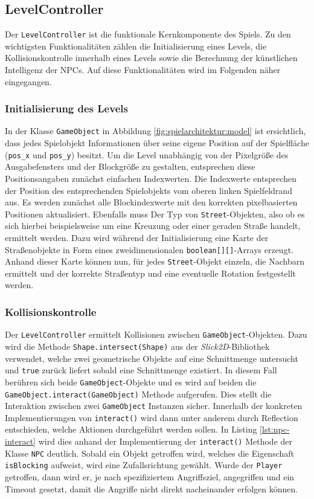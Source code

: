 \subsection{LevelController}
\label{sub:architektur:levelcontroller}

Der \texttt{LevelController} ist die funktionale Kernkomponente des Spiels.
Zu den wichtigsten Funktionalitäten zählen die Initialisierung eines Levels, die Kollisionskontrolle innerhalb eines Levels sowie die Berechnung der künstlichen Intelligenz der NPCs.
Auf diese Funktionalitäten wird im Folgenden näher eingegangen.

\subsubsection{Initialisierung des Levels}
In der Klasse \texttt{GameObject} in Abbildung \ref{fig:spielarchitektur:model} ist ersichtlich, dass jedes Spielobjekt Informationen über seine eigene Position auf der Spielfläche (\texttt{pos\_x} und \texttt{pos\_y}) besitzt.
Um die Level unabhängig von der Pixelgröße des Ausgabefensters und der Blockgröße zu gestalten, entsprechen diese Positionsangaben zunächst einfachen Indexwerten.
Die Indexwerte entsprechen der Position des entsprechenden Spielobjekts vom oberen linken Spielfeldrand aus.
Es werden zunächst alle Blockindexwerte mit den korrekten pixelbasierten Positionen aktualisiert.
Ebenfalls muss Der Typ von \texttt{Street}-Objekten, also ob es sich hierbei beispielsweise um eine Kreuzung oder einer geraden Straße handelt, ermittelt werden.
Dazu wird während der Initialisierung eine Karte der Straßenobjekte in Form eines zweidimensionalen \texttt{boolean[][]}-Arrays erzeugt.
Anhand dieser Karte können nun, für jedes \texttt{Street}-Objekt einzeln, die Nachbarn ermittelt und der korrekte Straßentyp und eine eventuelle Rotation festgestellt werden.

\subsubsection{Kollisionskontrolle}
Der \texttt{LevelController} ermittelt Kollisionen zwischen \texttt{GameObject}-Objekten.
Dazu wird die Methode \texttt{Shape.intersect(Shape)} aus der \textit{Slick2D}-Bibliothek verwendet, welche zwei geometrische Objekte auf eine Schnittmenge untersucht und \texttt{true} zurück liefert sobald eine Schnittmenge existiert.
In diesem Fall berühren sich beide \texttt{GameObject}-Objekte und es wird auf beiden die \texttt{GameObject.interact(GameObject)} Methode aufgerufen.
Dies stellt die Interaktion zwischen zwei \texttt{GameObject} Instanzen sicher.
Innerhalb der konkreten Implementierungen von \texttt{interact()} wird dann unter anderem durch Reflection entschieden, welche Aktionen durchgeführt werden sollen.
In Listing \ref{lst:npc-interact} wird dies anhand der Implementierung der \texttt{interact()} Methode der Klasse \texttt{NPC} deutlich.
Sobald ein Objekt getroffen wird, welches die Eigenschaft \texttt{isBlocking} aufweist, wird eine Zufallsrichtung gewählt.
Wurde der \texttt{Player} getroffen, dann wird er, je nach spezifiziertem Angriffsziel, angegriffen und ein Timeout gesetzt, damit die Angriffe nicht direkt nacheinander erfolgen können.

